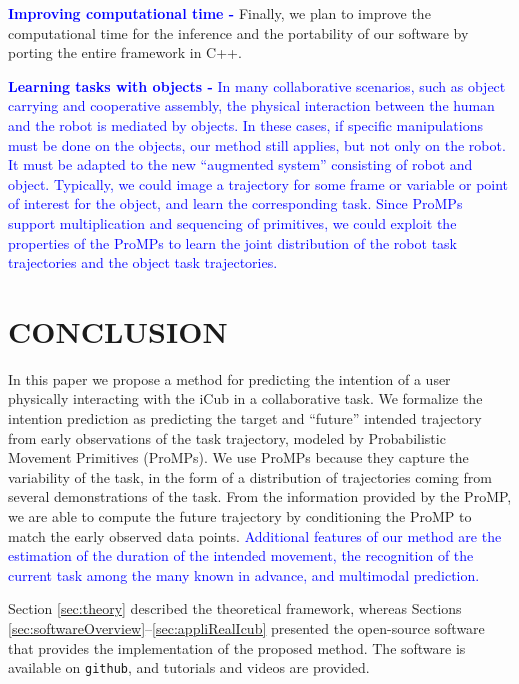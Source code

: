 \documentclass[utf8]{frontiersSCNS} %
\newcommand{\rev}[1]{\textcolor{blue}{#1}}
\begin{document}
\rev{\textbf{Improving computational time -}} Finally, we plan to improve the computational time for the inference and the portability of our software by porting the entire framework in C++.

\rev{\textbf{Learning tasks with objects -} In many collaborative scenarios, such as object carrying and cooperative assembly, the physical interaction between the human and the robot is mediated by objects. In these cases, if specific manipulations must be done on the objects, our method still applies, but not only on the robot. It must be adapted to the new ``augmented system'' consisting of robot and object. Typically, we could image a trajectory for some frame or variable or point of interest for the object, and learn the corresponding task. Since ProMPs support multiplication and sequencing of primitives, we could exploit the properties of the ProMPs to learn the joint distribution of the robot task trajectories and the object task trajectories.}

\section{CONCLUSION}
\label{sec:conclusions}



In this paper we propose a method for predicting the intention of a user physically interacting with the iCub in a collaborative task. We formalize the intention prediction as predicting the target and ``future'' intended trajectory from early observations of the task trajectory, modeled by Probabilistic Movement Primitives (ProMPs). 
We use ProMPs because they capture the variability of the task, in the form of a distribution of trajectories coming from several demonstrations of the task.
From the information provided by the ProMP, we are able to compute the future trajectory by conditioning the ProMP to match the early observed data points.
\rev{Additional features of our method are the estimation of the duration of the intended movement, the recognition of the current task among the many known in advance, and multimodal prediction.}

Section \ref{sec:theory} described the theoretical framework, whereas Sections \ref{sec:softwareOverview}--\ref{sec:appliRealIcub} presented the open-source software that provides the implementation of the proposed method. 
The software is available on \texttt{github}, and tutorials and videos are provided.
\end{document}
